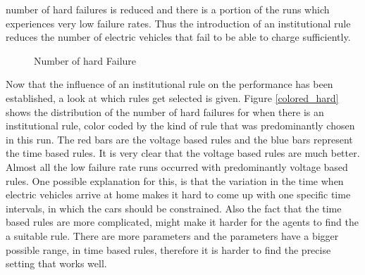 \documentclass[a4paper]{article}
\begin{document}
number of hard failures is reduced and there is a portion of the runs which experiences very low failure rates. Thus the introduction
of an institutional rule reduces the number of electric vehicles that fail to be able to charge sufficiently. \\
\begin{figure}[!ht]
\caption{Number of hard Failure}
\label{hard_second}
\end{figure}
\newpage
Now that the influence of an institutional rule on the performance has been established, a look at which rules get selected is given. 
Figure \ref{colored_hard} shows the distribution of the number of hard failures for when there is an institutional rule, color coded 
by the kind of rule that was predominantly chosen in this run. The red bars are the voltage based rules and the blue bars represent the 
time based rules. It is very clear that the voltage based rules are much better. Almost all the low failure rate runs occurred with 
predominantly voltage based rules. One possible explanation for this, is that the variation in the time when electric vehicles arrive at
home makes it hard to come up with one specific time intervals, in which the cars should be constrained. Also the fact that the time
based rules are more complicated, might make it harder for the agents to find the a suitable rule. There are more parameters and the 
parameters have a bigger possible range, in time based rules, therefore it is harder to find the precise setting that works well. 
\end{document}
